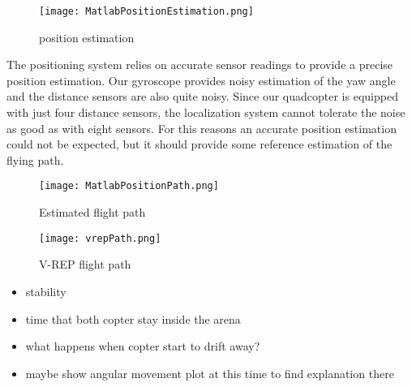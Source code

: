 \begin{figure}[h!]
 \begin{center}
  \texttt{[image: MatlabPositionEstimation.png]}
 \end{center}
  \caption{position estimation\label{fig:matlabPosEstimation}}
\end{figure}

The positioning system relies on accurate sensor readings to provide a precise position estimation. Our gyroscope provides noisy estimation of the yaw angle and the distance sensors are also quite noisy. Since our quadcopter is equipped with just four distance sensors, the localization system cannot tolerate the noise as good as with eight sensors. For this reasons an accurate position estimation could not be expected, but it should provide some reference estimation of the flying path.

\begin{figure}[h!]
 \begin{center}
  \texttt{[image: MatlabPositionPath.png]}
 \end{center}
  \caption{Estimated flight path\label{fig:matlabPosPath}}
\end{figure}

\begin{figure}[h!]
 \begin{center}
  \texttt{[image: vrepPath.png]}
 \end{center}
  \caption{V-REP flight path\label{fig:matlabPosPath}}
\end{figure}

\begin{itemize}
\item{stability}
\item{time that both copter stay inside the arena}
\item{what happens when copter start to drift away?}
\item{maybe show angular movement plot at this time to find explanation there}
\end{itemize}





